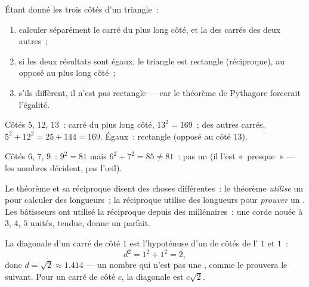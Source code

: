 \begin{method}\label{met:g8:pythagoras:test}
Étant donné les trois côtés d'un triangle~:
\begin{enumerate}
  \item calculer séparément le carré du plus long côté, et la 
        des carrés des deux autres~;
  \item si les deux résultats sont égaux, le triangle est rectangle
        (réciproque), au  opposé au plus long côté~;
  \item s'ils diffèrent, il n'est pas rectangle --- car le théorème de
        Pythagore forcerait l'égalité.
\end{enumerate}
\end{method}

\begin{example}\label{ex:g8:pythagoras:test}
Côtés $5$, $12$, $13$~: carré du plus long côté, $13^2 = 169$~;
 des autres carrés, $5^2 + 12^2 = 25 + 144 = 169$. Égaux~:
rectangle (opposé au côté $13$).

Côtés $6$, $7$, $9$~: $9^2 = 81$ mais $6^2 + 7^2 = 85 \neq 81$~:
pas un  (il l'est «~presque~» --- les nombres
décident, pas l'œil).
\end{example}

\begin{remark}
Le théorème et sa réciproque disent des choses différentes~: le
théorème \emph{utilise} un  pour calculer des longueurs~;
la réciproque utilise des longueurs pour \emph{prouver} un . Les bâtisseurs ont utilisé la réciproque depuis des
millénaires~: une corde nouée à $3$, $4$, $5$ unités, tendue, donne
un  parfait.
\end{remark}

\begin{example}\label{ex:g8:pythagoras:diagonal}
La diagonale d'un carré de côté $1$ est l'hypoténuse d'un  de côtés de l' $1$ et $1$~:
\[
d^2 = 1^2 + 1^2 = 2 ,
\]
donc $d = \sqrt2 \approx 1.414$ --- un nombre qui n'est pas une
, comme le prouvera le  suivant. Pour un carré de côté
$c$, la diagonale est $c\sqrt2$.
\end{example}


